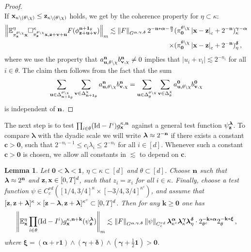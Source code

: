 \documentclass[12pt]{article}
\numberwithin{equation}{section}
\theoremstyle{plain}
\newtheorem{lemma}[theorem]{Lemma}
\theoremstyle{definition}
\newcommand{\abs}[1]{\left\vert #1 \right\vert}
\newcommand{\compAbs}[1]{\left\vert#1\right\vert_{\text{c}}}
\newcommand{\norm}[1]{\left\Vert #1\right\Vert}
\newcommand{\Id}{\mbox{Id}}
\def\bE{\mathbb{E}}\def\bW{\mathbb{W}}
\def\fc{\mathbf c}\def\fd{\mathbf d}
\def\fk{\mathbf k}\def\fl{\mathbf l}
\def\fu{\mathbf u}\def\fv{\mathbf v}
\def\falpha{{\boldsymbol\alpha}}
\def\fgamma{{\boldsymbol\gamma}}
\def\fdelta{{\boldsymbol\delta}}
\def\flambda{{\boldsymbol\lambda}}
\def\fxi{{\boldsymbol\xi}}
\def\foo{{\boldsymbol 0}}
\def\fone{{\boldsymbol 1}}
\begin{document}
\begin{proof}
\begin{equation*}
    \end{equation*}
If $\mathbf x_{\kappa\setminus(\theta\setminus\chi)}\le \mathbf z_{\kappa\setminus(\theta\setminus\chi)}$ holds, we get by the coherence property for $\eta\subset\kappa$:
    \begin{align*}
\norm{\bE^\eta_{\pi^{\theta\setminus\chi}_\fz\fx}\square^\kappa_{\pi^{\theta\setminus\chi}_{\fz}\fx,\fz+\fv+\fu} F(\phi^{\fn+\mathbf{1}_\theta}_{\fz+\fu+\fv})}_m \lesssim \norm{F}_{G^{\falpha,\fgamma,\fdelta}} 2^{-\fn*\falpha-\frac\fn2}&(\pi_{\foo}^{\theta\setminus\chi}\compAbs{\fx-\fz}+2^{-\fn})^{\fgamma-\falpha}_{\kappa}\\ \times &(\pi_{\foo}^{\theta\setminus\chi}\compAbs{\fx-\fz}+2^{-\fn})^{\fdelta}_{\eta}\,,
\end{align*}
    where we use the property that $a_{\fu,\theta\setminus\chi}^{\fn} b_{\fv,\chi}^{\fn} \neq 0$ implies that $\abs{u_i+v_i}\lesssim 2^{-n_i}$ for all  $i\in\theta$. The claim then follows from the fact that the sum
    \[\sum_{\fu\in\Delta_{\fn+\fone_\theta}^{\theta\setminus\chi}}\sum_{\fv\in\Delta_{\fn+\fone_\theta}^{\chi}}a_{\fu,\theta\setminus\chi}^{\fn} b_{\fv,\chi}^{\fn} = \sum_{\fu\in\Delta_{\theta}^{\theta\setminus\chi}}\sum_{\fv\in\Delta_{\theta}^{\chi}}a_{\fu,\theta\setminus\chi}^{\foo} b_{\fv,\chi}^{\foo}\]
    is independent of $\mathbf n$. 
\end{proof}
The next step is to test $\prod_{i\in\theta}(\Id-I^i)g^{\kappa,\fn}_\fx$ against a general test function $\psi_\fz^\flambda$. To compare $\flambda$ with the dyadic scale we will write $\flambda\approx 2^{-\fn}$ if there exists a constant $\fc>\foo$, such that $2^{-n_i-1} \le c_i \lambda_i\le 2^{-n_i}$ for all $i\in[d]$. Whenever such a constant $\fc>\foo$ is chosen, we allow all constants in $\lesssim$ to depend on $\fc$. 
\begin{lemma}\label{lem:technical3}
    Let $\foo<\flambda<\fone$, $\eta\subset\kappa\subset[d]$ and $\theta\subset[d]$. Choose $\mathbf n$ such that $\flambda\approx 2^{\fn}$ and $\mathbf z,\mathbf x\in [0,T]^d$, such that $z_i = x_i$ for all $i\in\kappa$. Finally, choose a test function $\psi\in C^{rd}_c([1/4,3/4]^\kappa\times[-3/4,3/4]^{\kappa^c})$, and assume that $[\fz, \fz+\flambda]^\kappa\times[\fz-\flambda,\fz+\flambda]^{\kappa^c}\subset[0,T]^d$. Then for any $\fk\ge\foo$ one has 
    \begin{equation*}
        \norm{\bE_\fx^\eta\prod_{i\in\theta}(\Id-I^i)g_\fx^{\kappa,\fn+\fk}(\psi_\fz^{\flambda})}_m \lesssim \norm{F}_{G^{\falpha,\fgamma,\fdelta}} \norm{\psi}_{C_c^{rd}} \flambda^{\falpha}_{\kappa^c}\flambda^{\fgamma}_{\kappa}\flambda^{\fdelta}_{\eta} \cdot 2^{-\fk*\falpha}_{\theta^c}2^{-\fk*\fxi}_{\theta}\,,
    \end{equation*}
%
    where $\fxi = (\falpha+r\fone)\wedge(\fgamma+\fdelta)\wedge(\fgamma+\frac 12\fone)>\foo$.
\end{lemma}
\end{document}
